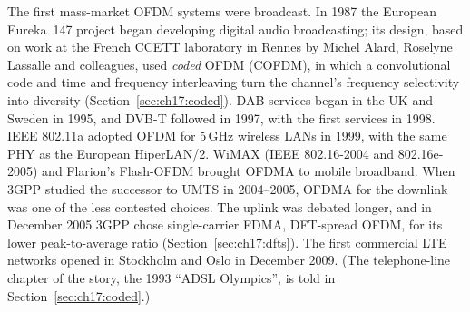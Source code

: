 \begin{history}
The first mass-market OFDM systems were broadcast. In 1987 the European Eureka~147 project began
developing digital audio broadcasting; its design, based on work at the French CCETT laboratory in Rennes by
Michel Alard, Roselyne Lassalle and colleagues, used \emph{coded} OFDM (COFDM), in which a convolutional code
and time and frequency interleaving turn the channel's frequency selectivity into diversity
(Section~\ref{sec:ch17:coded}). DAB services began in the UK and Sweden in 1995, and DVB-T followed in 1997,
with the first services in 1998. IEEE 802.11a adopted OFDM for 5\,GHz wireless LANs in 1999, with the same
PHY as the European HiperLAN/2. WiMAX (IEEE 802.16-2004 and 802.16e-2005) and Flarion's Flash-OFDM brought
OFDMA to mobile broadband. When 3GPP studied the successor to UMTS in 2004--2005, OFDMA for the downlink was
one of the less contested choices. The uplink was debated longer, and in December 2005 3GPP chose
single-carrier FDMA, DFT-spread OFDM, for its lower peak-to-average ratio (Section~\ref{sec:ch17:dfts}). The
first commercial LTE networks opened in Stockholm and Oslo in December 2009. (The telephone-line chapter of
the story, the 1993 ``ADSL Olympics'', is told in Section~\ref{sec:ch17:coded}.)
\end{history}

